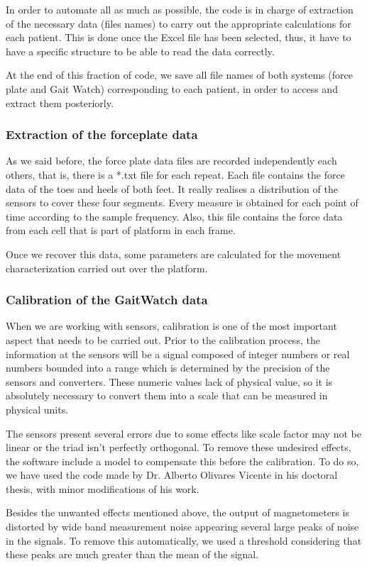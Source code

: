 In order to automate all as much as possible, the code is in charge of extraction of the necessary data (files names) to carry out the appropriate calculations for each patient. This is done once the Excel file has been selected, thus, it have to have a specific structure to be able to read the data correctly.

At the end of this fraction of code, we save all file names of both systems (force plate and Gait Watch) corresponding to each patient, in order to access and extract them posteriorly.

\subsubsection{Extraction of the forceplate data}
As we said before, the  force plate data files are recorded independently each others, that is, there is a *.txt file for each repeat.
Each file contains the force data of the toes and heels of both feet. It really realises a distribution of the sensors to cover these four segments. Every measure is obtained for each point of time according to the sample frequency. Also, this file contains the force data from each cell that is part of platform in each frame.

Once we recover this data, some parameters are calculated for the movement characterization carried out over the platform. 

\subsubsection{Calibration of the GaitWatch data}
When we are working with sensors, calibration is one of the most important aspect that needs to be carried out. Prior to the calibration process,
the information at the sensors  will be a signal composed of integer
numbers  or real numbers bounded into a range which is determined by the precision of the sensors and converters. These numeric values lack of physical value, so it is absolutely necessary to convert them into a scale that can be measured in physical units.

The sensors present several errors due to some effects like scale factor may not be linear or the triad isn’t perfectly orthogonal. To remove these undesired effects, the software include a model to compensate this before the calibration. 
To do so, we have used the code made by Dr. Alberto Olivares Vicente in his doctoral thesis, with minor modifications of his work.

Besides the unwanted effects mentioned above, the output of magnetometers is distorted by wide band measurement noise appearing several large peaks of noise in the signals. To remove this automatically, we used a threshold considering that these peaks are much greater than the mean of the signal.

